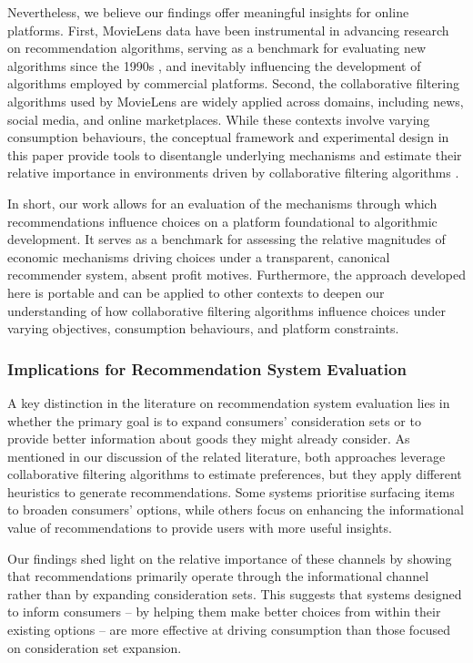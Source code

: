 \documentclass[12pt]{article}
\theoremstyle{newtheorem}
\begin{document}
Nevertheless, we believe our findings offer meaningful insights for online platforms. 
First, MovieLens data have been instrumental in advancing research on recommendation algorithms, serving as a benchmark for evaluating new algorithms since the 1990s \citep{HarperKonstan2015ACMTIIS}, and inevitably influencing the development of algorithms employed by commercial platforms. 
Second, the collaborative filtering algorithms used by MovieLens are widely applied across domains, including news, social media, and online marketplaces. 
While these contexts involve varying consumption behaviours, the conceptual framework and experimental design in this paper provide tools to disentangle underlying mechanisms and estimate their relative importance in environments driven by collaborative filtering algorithms \citep{EkstrandLudwigKolbRiedl2011}.

In short, our work allows for an evaluation of the mechanisms through which recommendations influence choices on a platform foundational to algorithmic development. 
It serves as a benchmark for assessing the relative magnitudes of economic mechanisms driving choices under a transparent, canonical recommender system, absent profit motives. 
Furthermore, the approach developed here is portable and can be applied to other contexts to deepen our understanding of how collaborative filtering algorithms influence choices under varying objectives, consumption behaviours, and platform constraints.


\subsubsection{Implications for Recommendation System Evaluation} 
A key distinction in the literature on recommendation system evaluation lies in whether the primary goal is to expand consumers' consideration sets or to provide better information about goods they might already consider. 
As mentioned in our discussion of the related literature, both approaches leverage collaborative filtering algorithms to estimate preferences, but they apply different heuristics to generate recommendations. 
Some systems prioritise surfacing items to broaden consumers' options, while others focus on enhancing the informational value of recommendations to provide users with more useful insights. 

Our findings shed light on the relative importance of these channels by showing that recommendations primarily operate through the informational channel rather than by expanding consideration sets. 
This suggests that systems designed to inform consumers -- by helping them make better choices from within their existing options -- are more effective at driving consumption than those focused on consideration set expansion. 
\end{document}
